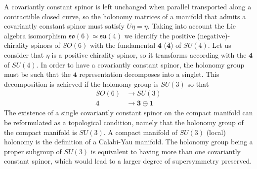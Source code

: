 A covariantly constant spinor is left unchanged when parallel transported along a contractible
closed curve, so the holonomy matrices of a manifold that admits a covariantly constant spinor 
must satisfy $U\eta = \eta$.
Taking into account the Lie algebra isomorphism $\mathfrak{so}(6)\simeq \mathfrak{su}(4)$ we identify the positive
(negative)-chirality spinors of $SO(6)$ with the fundamental $\mathbf 4$ ($\mathbf {\bar 4}$)
of $SU(4)$.
Let us consider that $\eta$ is a positive chirality spinor, so it transforms according with the 
$\mathbf 4$ of $SU(4)$.
In order to have a covariantly constant spinor, the holonomy group must be such that the $\mathbf 4$
representation decomposes into a singlet.
This decomposition is achieved if the holonomy group is $SU(3)$ so that
 \begin{align}
  SO(6)  &\to SU(3)\\
  \mathbf 4 &\to \mathbf 3 \oplus \mathbf 1
\end{align} 
The existence of a single covariantly constant spinor on the compact manifold can be reformulated
as a topological condition, namely that the holonomy group of the compact manifold is $SU(3)$.
A compact manifold of $SU(3)$ (local) holonomy is the definition of a Calabi-Yau manifold.
The holonomy group being a proper subgroup of $SU(3)$ is equivalent to having more than one covariantly 
constant spinor, which would lead to a larger degree of supersymmetry preserved.


